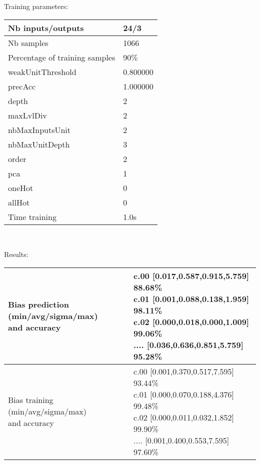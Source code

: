 Training parameters:\\
\begin{center}
\begin{tabular}{|l|l|}
\hline
Nb inputs/outputs&24/3\\
\hline
Nb samples&1066\\
\hline
Percentage of training samples&90\%\\
\hline
weakUnitThreshold&0.800000\\
\hline
precAcc&1.000000\\
\hline
depth&2\\
\hline
maxLvlDiv&2\\
\hline
nbMaxInputsUnit&2\\
\hline
nbMaxUnitDepth&3\\
\hline
order&2\\
\hline
pca&1\\
\hline
oneHot&0\\
\hline
allHot&0\\
\hline
Time training&1.0s\\
\hline
\end{tabular}\\
\end{center}\newline
Results:
\begin{center}
\begin{tabular}{|l|l|}
\hline
\makecell{Bias prediction (min/avg/sigma/max)\\and accuracy}&\makecell{c.00 [0.017,0.587,0.915,5.759] 88.68\%\\
c.01 [0.001,0.088,0.138,1.959] 98.11\%\\
c.02 [0.000,0.018,0.000,1.009] 99.06\%\\
.... [0.036,0.636,0.851,5.759] 95.28\%\\
}\\

\hline
\makecell{Bias training (min/avg/sigma/max)\\and accuracy}&\makecell{c.00 [0.001,0.370,0.517,7.595] 93.44\%\\
c.01 [0.000,0.070,0.188,4.376] 99.48\%\\
c.02 [0.000,0.011,0.032,1.852] 99.90\%\\
.... [0.001,0.400,0.553,7.595] 97.60\%\\
}\\
\hline
\end{tabular}\
\end{center}
